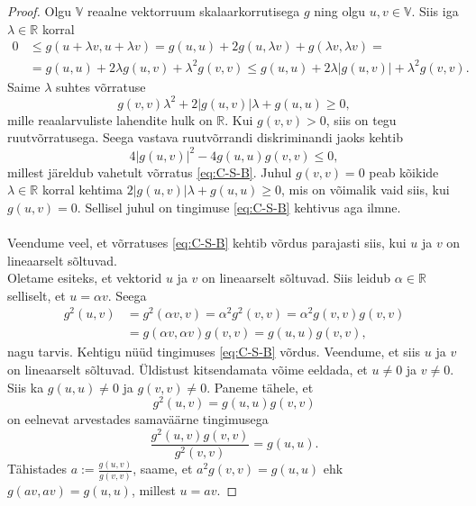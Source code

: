 \documentclass[a4paper,12pt]{article}
\theoremstyle{plain}
\theoremstyle{definition}
\numberwithin{equation}{section}
\begin{document}
\begin{proof}
Olgu $\mathbb{V}$ reaalne vektorruum skalaarkorrutisega $g$ ning olgu $u, v \in \mathbb{V}$. Siis iga $\lambda \in \mathbb{R}$ korral
\begin{align*}
0 &\leq g\left(u+\lambda v,u+\lambda v\right) = g\left(u,u\right) + 2g\left(u, \lambda v \right) + g\left(\lambda v, \lambda v\right) = \\
&= g\left(u,u\right) + 2\lambda g\left(u, v \right) + \lambda^2 g\left(v,v\right) \leq g\left(u,u\right) + 2\lambda | g\left(u, v \right)| + \lambda^2 g\left(v,v\right).
\end{align*}
Saime $\lambda$ suhtes võrratuse
\begin{equation*}
g\left(v,v\right)\lambda^2 + 2|g\left(u, v \right)|\lambda + g\left(u,u\right) \geq 0,
\end{equation*}
mille reaalarvuliste lahendite hulk on $\mathbb{R}$. Kui $g\left(v,v\right) > 0$, siis on tegu ruut\-võrratusega. Seega vastava ruutvõrrandi diskriminandi jaoks kehtib
\begin{equation*}
4|g\left(u,v\right)|^2 - 4g\left(u,u\right)g\left(v,v\right) \leq 0,
\end{equation*}
millest järeldub vahetult võrratus \ref{eq:C-S-B}. Juhul $g\left(v,v\right) = 0$ peab kõikide $\lambda \in \mathbb{R}$ korral kehtima $2|g\left(u,v\right)|\lambda + g\left(u,u\right) \geq 0$, mis on võimalik vaid siis, kui $g\left(u,v\right) = 0$. Sellisel juhul on tingimuse \ref{eq:C-S-B} kehtivus aga ilmne.
\paragraph{}
Veendume veel, et võrratuses \ref{eq:C-S-B} kehtib võrdus parajasti siis, kui $u$ ja $v$ on lineaarselt sõltuvad. \\
Oletame esiteks, et vektorid $u$ ja $v$ on lineaarselt sõltuvad. Siis leidub $\alpha \in \mathbb{R}$ selliselt, et $u = \alpha v$. Seega
\begin{align*}
g^2\left(u,v\right) &= g^2 \left(\alpha v,v\right) = \alpha^2 g^2 \left(v,v\right) = \alpha^2 g \left(v,v\right) g \left(v,v\right) \\
&= g \left(\alpha v,\alpha v\right)g \left( v,v\right) = g \left(u,u\right)g \left(v,v\right),
\end{align*}
nagu tarvis.
\newline
Kehtigu nüüd tingimuses \ref{eq:C-S-B} võrdus. Veendume, et siis $u$ ja $v$ on lineaarselt sõltuvad. Üldistust kitsendamata võime eeldada, et $u \neq 0$ ja $v \neq 0$. Siis ka $g \left(u,u\right) \neq 0$ ja $g \left(v,v\right) \neq 0$. Paneme tähele, et
\[g^2 \left(u, v \right) = g \left(u, u \right) g \left(v, v \right)\]
on eelnevat arvestades samaväärne tingimusega
\[\frac{g^2 \left(u, v \right) g \left(v, v \right)}{g^2 \left(v, v \right) } = g \left(u, u \right). \]
Tähistades $a := \frac{g \left(u, v \right) }{g \left(v, v \right) }$, saame, et $a^2 g \left(v, v \right) = g \left(u, u \right)$ ehk $g \left(av, av \right) = g \left(u, u \right)$, millest $u = av$.
\end{proof}
\end{document}
